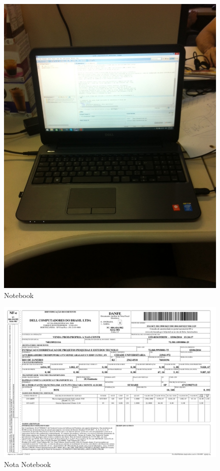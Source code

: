 \begin{figure}[h!]
 \centering
 \includegraphics[width=1\columnwidth]{Notebook/foto}
 \caption{Notebook}
\end{figure}

\begin{figure}[h!]
 \centering
 \includegraphics[width=1\columnwidth]{Notebook/nota_notebook.pdf}
 \caption{Nota Notebook}
 \end{figure}
